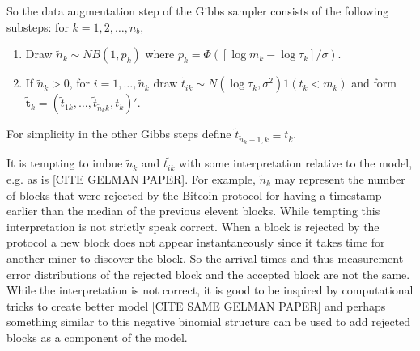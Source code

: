 \documentclass{article}
\begin{document}
So the data augmentation step of the Gibbs sampler consists of the following substeps: for $k=1,2,\dots,n_{b}$,
\begin{enumerate}
\item Draw $\tilde{n}_k \sim NB(1,p_k)$ where $p_k = \Phi([\log m_k - \log \tau_k]/\sigma)$.
\item If $\tilde{n}_k > 0$, for $i=1,\dots,\tilde{n}_k$ draw $\tilde{t}_{ik} \sim N(\log\tau_k,\sigma^2)1(t_k < m_k)$ and form $\tilde{\bm{t}}_k = (\tilde{t}_{1k},\dots,\tilde{t}_{\tilde{n}_kk}, t_k)'$.
\end{enumerate}
For simplicity in the other Gibbs steps define $\tilde{t}_{\tilde{n}_k + 1,k}\equiv t_k$.

It is tempting to imbue $\tilde{n}_k$ and $\tilde{t_{ik}}$ with some interpretation relative to the model, e.g. as is [CITE GELMAN PAPER]. For example, $\tilde{n}_k$ may represent the number of blocks that were rejected by the Bitcoin protocol for having a timestamp earlier than the median of the previous elevent blocks. While tempting this interpretation is not strictly speak correct. When a block is rejected by the protocol a new block does not appear instantaneously since it takes time for another miner to discover the block. So the arrival times and thus measurement error distributions of the rejected block and the accepted block are not the same. While the interpretation is not correct, it is good to be inspired by computational tricks to create better model [CITE SAME GELMAN PAPER] and perhaps something similar to this negative binomial structure can be used to add rejected blocks as a component of the model.
\end{document}
